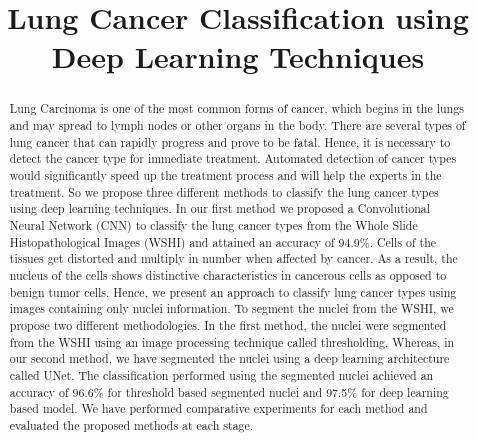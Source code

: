 \documentclass[conference]{IEEEtran}
\begin{document}
\title{Lung Cancer Classification using Deep Learning Techniques}



\author{
}
 
 \maketitle

\begin{abstract}
Lung Carcinoma is one of the most common forms of cancer, which begins in the lungs and may spread to lymph nodes or other organs in the body. There are several types of lung cancer that can rapidly progress and prove to be fatal. Hence, it is necessary to detect the cancer type for immediate treatment.  Automated detection of cancer types would significantly speed up the treatment process and will help the experts in the treatment. So we propose three different methods to classify the lung cancer types using deep learning techniques. In our first method we proposed a Convolutional Neural Network (CNN) to classify the lung cancer types from the Whole Slide Histopathological Images (WSHI) and attained an accuracy of 94.9\%. Cells of the tissues get distorted and multiply in number when affected by cancer. As a result, the nucleus of the cells shows distinctive characteristics in cancerous cells as opposed to benign tumor cells. Hence, we present an approach to classify lung cancer types using images containing only nuclei information. To segment the nuclei from the WSHI, we propose two different methodologies. In the first method, the nuclei were segmented from the WSHI using an image processing technique called thresholding. Whereas, in our second method, we have segmented the nuclei using a deep learning architecture called UNet. The classification performed using the segmented nuclei achieved an accuracy of 96.6\% for threshold based segmented nuclei and 97.5\% for deep learning based model.  We have performed comparative experiments for each method and evaluated the proposed methods at each stage.
\end{abstract}
\end{document}
